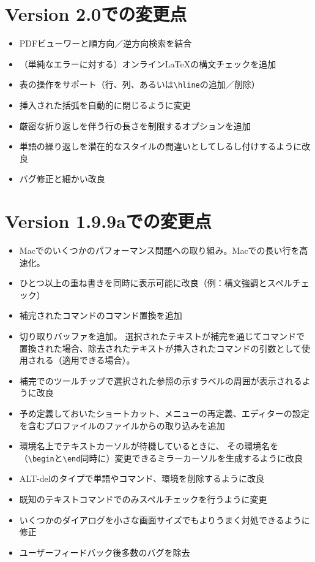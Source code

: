 \section{Version 2.0での変更点}

\begin{itemize}
\item
  PDFビューワーと順方向／逆方向検索を結合
\item
  （単純なエラーに対する）オンラインLaTeXの構文チェックを追加
\item
  表の操作をサポート（行、列、あるいは\verb+\hline+の追加／削除）
\item
  挿入された括弧を自動的に閉じるように変更
\item
  厳密な折り返しを伴う行の長さを制限するオプションを追加
\item
  単語の繰り返しを潜在的なスタイルの間違いとしてしるし付けするように改良
\item
  バグ修正と細かい改良
\end{itemize}

\section{Version 1.9.9aでの変更点}

\begin{itemize}
\item
  Macでのいくつかのパフォーマンス問題への取り組み。Macでの長い行を高速化。
\item
  ひとつ以上の重ね書きを同時に表示可能に改良（例：構文強調とスペルチェック）
\item
  補完されたコマンドのコマンド置換を追加
\item
  切り取りバッファを追加。
  選択されたテキストが補完を通じてコマンドで置換された場合、除去されたテキストが挿入されたコマンドの引数として使用される（適用できる場合）。
\item
  補完でのツールチップで選択された参照の示すラベルの周囲が表示されるように改良
\item
  予め定義しておいたショートカット、メニューの再定義、エディターの設定を含むプロファイルのファイルからの取り込みを追加
\item
  環境名上でテキストカーソルが待機しているときに、
  その環境名を（\verb+\begin+と\verb+\end+同時に）変更できるミラーカーソルを生成するように改良
\item
  ALT-delのタイプで単語やコマンド、環境を削除するように改良
\item
  既知のテキストコマンドでのみスペルチェックを行うように変更
\item
  いくつかのダイアログを小さな画面サイズでもよりうまく対処できるように修正
\item
  ユーザーフィードバック後多数のバグを除去
\end{itemize}

